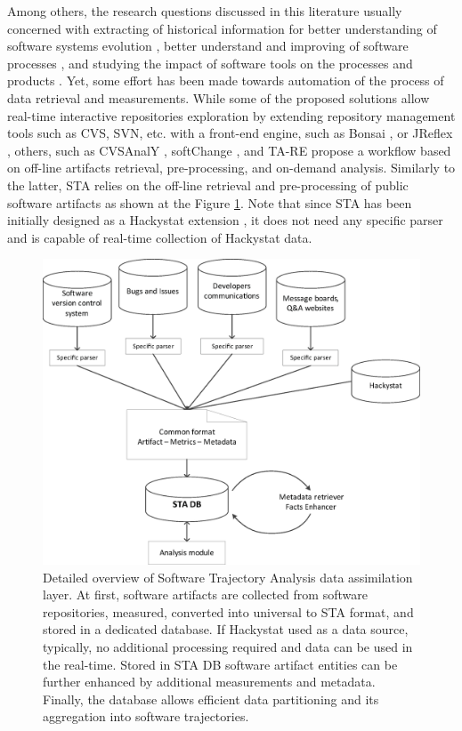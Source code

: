 Among others, the research questions discussed in this literature usually concerned with extracting of 
historical information for better understanding of software systems evolution \cite{citeulike:277045} \cite{citeulike:4000311}, 
better understand and improving of software processes \cite{citeulike:5803126}, 
and studying the impact of software tools on the processes and products \cite{citeulike:13125389}. 
Yet, some effort has been made towards automation of the process of data retrieval and measurements. 
While some of the proposed solutions allow real-time interactive repositories exploration by extending 
repository management tools such as CVS, SVN, etc. with a front-end engine, such as Bonsai \cite{bonsai},
or JReflex \cite{citeulike:3017440}, others, such as CVSAnalY \cite{citeulike:6544724}, softChange \cite{citeulike:13125395},
and {TA}-{RE} \cite{citeulike:4000311} propose a workflow based on off-line artifacts retrieval, 
pre-processing, and on-demand analysis.
Similarly to the latter, STA relies on the off-line retrieval and pre-processing of public software artifacts as
shown at the Figure \ref{fig:sta-assimilation}. Note that since STA has been initially designed as a Hackystat 
extension \cite{csdl2-10-09}, it does not need any specific parser and is capable of real-time 
collection of Hackystat data.

\begin{figure}[t]
   \centering
   \vspace{1cm}
   \includegraphics[width=115mm]{figures/Flow.eps}
   \caption{Detailed overview of Software Trajectory Analysis data assimilation layer. 
    At first, software artifacts are collected from software repositories, measured, converted into 
    universal to STA format, and stored in a dedicated database.
    If Hackystat used as a data source, typically, no additional processing required and data can be used in the real-time.
    Stored in STA DB software artifact entities can be further enhanced by additional measurements and metadata.
    Finally, the database allows efficient data partitioning and its aggregation into software trajectories.}
   \label{fig:sta-assimilation}
\end{figure}

